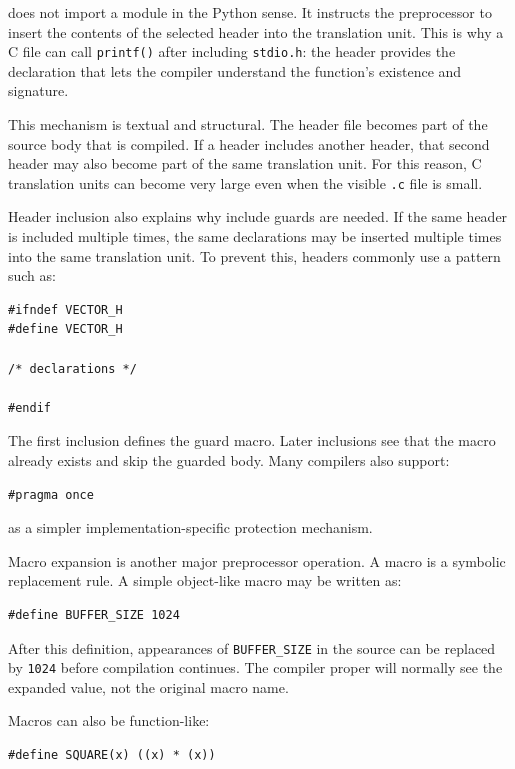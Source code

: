does not import a module in the Python sense. It instructs the preprocessor to insert the contents of the selected header into the translation unit. This is why a C file can call \texttt{printf()} after including \texttt{stdio.h}: the header provides the declaration that lets the compiler understand the function's existence and signature.

This mechanism is textual and structural. The header file becomes part of the source body that is compiled. If a header includes another header, that second header may also become part of the same translation unit. For this reason, C translation units can become very large even when the visible \texttt{.c} file is small.

Header inclusion also explains why include guards are needed. If the same header is included multiple times, the same declarations may be inserted multiple times into the same translation unit. To prevent this, headers commonly use a pattern such as:

\begin{verbatim}
#ifndef VECTOR_H
#define VECTOR_H

/* declarations */

#endif
\end{verbatim}

The first inclusion defines the guard macro. Later inclusions see that the macro already exists and skip the guarded body. Many compilers also support:

\begin{verbatim}
#pragma once
\end{verbatim}

as a simpler implementation-specific protection mechanism.

Macro expansion is another major preprocessor operation. A macro is a symbolic replacement rule. A simple object-like macro may be written as:

\begin{verbatim}
#define BUFFER_SIZE 1024
\end{verbatim}

After this definition, appearances of \texttt{BUFFER\_SIZE} in the source can be replaced by \texttt{1024} before compilation continues. The compiler proper will normally see the expanded value, not the original macro name.

Macros can also be function-like:

\begin{verbatim}
#define SQUARE(x) ((x) * (x))
\end{verbatim}

